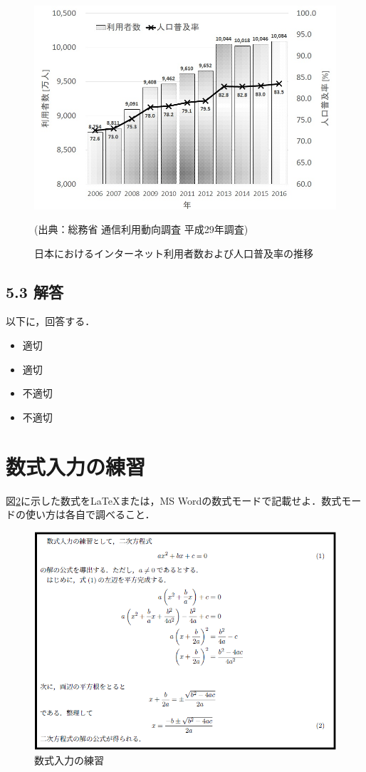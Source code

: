 \documentclass[11pt, a4paper]{jsarticle}
\begin{document}
\begin{figure}[h]
\vspace{-5mm}
\centering
\includegraphics[width=0.9\linewidth]{internet.jpg}
\caption{日本におけるインターネット利用者数および人口普及率の推移}(出典：総務省 通信利用動向調査 平成29年調査)
\label{fig:arai}
\end{figure}
\subsection*{5.3 解答}

以下に，回答する．

\begin{itemize}
    \item[(1)] 適切
    \item[(2)] 適切
    \item[(3)] 不適切
    \item[(4)] 不適切
\end{itemize}

\newpage
\section{数式入力の練習}
図\ref{fig:eqs}に示した数式を\LaTeX または，MS Wordの数式モードで記載せよ．数式モードの使い方は各自で調べること．

\begin{figure}[h]
\centering
\includegraphics[width=0.9\linewidth]{eqs.png}
\caption{数式入力の練習}
\label{fig:eqs}
\end{figure}
\end{document}
